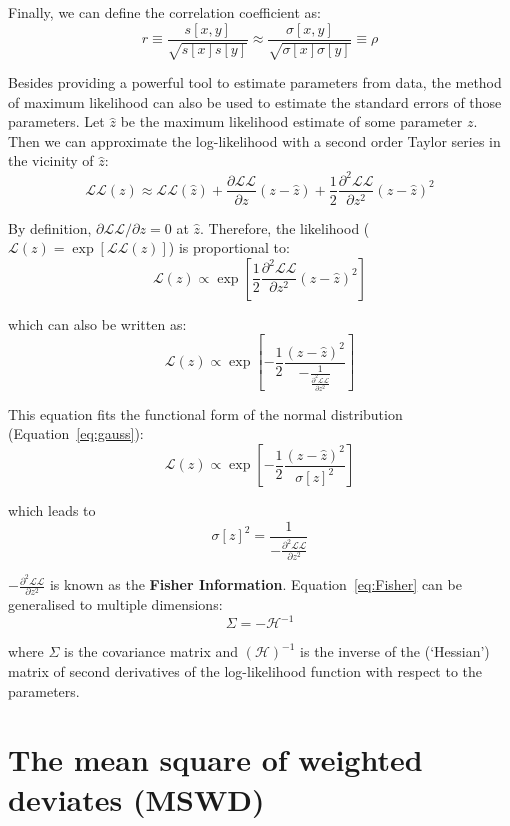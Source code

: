 \begin{refsection}
Finally, we can define the correlation coefficient as:
\begin{equation}
  r \equiv \frac{s[x,y]}{\sqrt{s[x]s[y]}} 
  \approx 
  \frac{\sigma[x,y]}{\sqrt{\sigma[x]\sigma[y]}}
  \equiv \rho
  \label{eq:r}
\end{equation}

Besides providing a powerful tool to estimate parameters from data,
the method of maximum likelihood can also be used to estimate the
standard errors of those parameters. Let $\hat{z}$ be the maximum
likelihood estimate of some parameter $z$. Then we can approximate the
log-likelihood with a second order Taylor series in the vicinity of
$\hat{z}$:
\[
  \mathcal{LL}(z) \approx \mathcal{LL}(\hat{z}) +
  \frac{\partial\mathcal{LL}}{\partial{z}} (z-\hat{z}) +
  \frac{1}{2} \frac{\partial^2\mathcal{LL}}{\partial{z^2}} (z-\hat{z})^2
\]

By definition, $\partial{\mathcal{LL}}/\partial{z}=0$ at
$\hat{z}$. Therefore, the likelihood ($\mathcal{L}(z) =
\exp[\mathcal{LL}(z)]$) is proportional to:
\[
\mathcal{L}(z) \propto 
\exp\left[
  \frac{1}{2} \frac{\partial^2\mathcal{LL}}{\partial{z^2}} (z-\hat{z})^2
  \right]
\]

\noindent which can also be written as:
\[
\mathcal{L}(z) \propto \exp\!\left[
  -\frac{1}{2} \frac{(z-\hat{z})^2}{
    -\frac{1}{\frac{\partial^2\mathcal{LL}}{\partial{z^2}}}
  }\right]
\]

This equation fits the functional form of the normal distribution
(Equation~\ref{eq:gauss}):
\[
\mathcal{L}(z) \propto \exp\!\left[
  -\frac{1}{2} \frac{(z-\hat{z})^2}{\sigma[z]^2}
  \right]
\]

\noindent which leads to
\begin{equation}
  \sigma[z]^2 = \frac{1}{-\frac{\partial^2\mathcal{LL}}{\partial{z^2}}}
  \label{eq:Fisher}
\end{equation}

$-\frac{\partial^2\mathcal{LL}}{\partial{z^2}}$ is known as the
\textbf{Fisher Information}. Equation~\ref{eq:Fisher} can be
generalised to multiple dimensions:
\begin{equation}
  \Sigma = -\mathcal{H}^{-1}
  \label{eq:multidimFisher}
\end{equation}

\noindent where $\Sigma$ is the covariance matrix and
$(\mathcal{H})^{-1}$ is the inverse of the (`Hessian') matrix of
second derivatives of the log-likelihood function with respect to the
parameters.

\section{The mean square of weighted deviates (MSWD)}
\label{sec:mswd}


\end{refsection}

